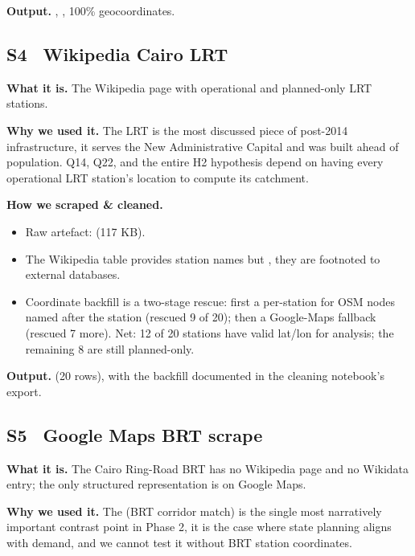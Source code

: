 \textbf{Output.} , , 100\%
geocoordinates.

\subsection{S4 \textbullet\ Wikipedia Cairo LRT}

\textbf{What it is.} The Wikipedia page 
with operational and planned-only LRT stations.

\textbf{Why we used it.} The LRT is the most discussed
piece of post-2014 infrastructure, it serves the New Administrative
Capital and was built ahead of population. Q14, Q22, and the entire
H2 hypothesis depend on having every operational LRT station's location
to compute its catchment.

\textbf{How we scraped \& cleaned.}
\begin{itemize}
 \item Raw artefact:  (117 KB).
 \item The Wikipedia table provides station names but , they are footnoted to external
 databases.
 \item Coordinate backfill is a two-stage rescue: first a per-station
  for OSM nodes named after the station
 (rescued 9 of 20); then a Google-Maps fallback (rescued 7
 more). Net: 12 of 20 stations have valid lat/lon for analysis;
 the remaining 8 are still planned-only.
\end{itemize}

\textbf{Output.}  (20 rows), with the backfill
documented in the cleaning notebook's
 export.


\subsection{S5 \textbullet\ Google Maps BRT scrape}

\textbf{What it is.} The Cairo Ring-Road BRT has no Wikipedia page and
no Wikidata entry; the only structured representation is on Google Maps.

\textbf{Why we used it.} The  (BRT corridor match) is
the single most narratively important contrast point in Phase 2, 
it is the case where state planning aligns with demand, and we cannot
test it without BRT station coordinates.

